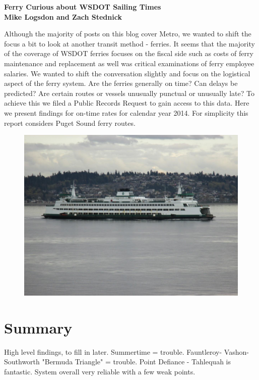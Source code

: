 \documentclass[11pt, letterpaper]{article}
\begin{document}
\Large 
\begin{center}
\bf Ferry Curious about WSDOT Sailing Times \\
\bf Mike Logsdon and Zach Stednick
\end{center} 
\normalsize 


Although the majority of posts on this blog cover Metro, we wanted to shift the focus a bit to look at another transit method - ferries. It seems that the majority of the coverage of WSDOT ferries focuses on the fiscal side such as costs of ferry maintenance and replacement as well was critical examinations of ferry employee salaries.
We wanted to shift the conversation slightly and focus on the logistical aspect of the ferry system. Are the ferries generally on time? Can delays be predicted? Are certain routes or vessels unusually punctual or unusually late? 
To achieve this we filed a Public Records Request to gain access to this data. Here we present findings for on-time rates for calendar year 2014. For simplicity this report considers Puget Sound ferry routes.

\begin{figure}
\begin{center}
\includegraphics[scale = .4]{ferry.jpg}
\end{center}
\end{figure}

\section*{Summary}

High level findings, to fill in later. Summertime = trouble. Fauntleroy- Vashon-Southworth "Bermuda Triangle" = trouble. Point Defiance - Tahlequah is fantastic. System overall very reliable with a few weak points.
\end{document}
